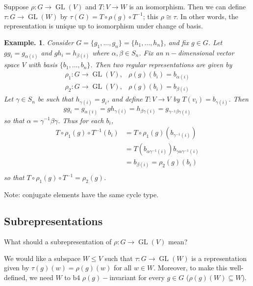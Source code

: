 \documentclass[11pt, a4paper]{memoir}
\theoremstyle{change}
\theoremstyle{plain}
\theoremstyle{nonumberplain}
\newtheorem{example}{Example.}
\DeclareMathOperator{\GL}{GL}
\numberwithin{equation}{section}
\begin{document}
Suppose $\rho:G\to\GL(V)$ and $T:V\to W$ is an isomorphism.
Then we can define $\tau:G\to\GL(W)$ by $\tau(G)=T\circ\rho(g)\circ T^{-1}$; this $\rho\cong\tau$.
In other words, the representation is unique up to isomorphism under change of basis.
\begin{example}
    Consider $G=\{g_1,\ldots,g_n\}=\{h_1,\ldots,h_n\}$, and fix $g\in G$.
    Let $gg_i=g_{\alpha(i)}$ and $gh_i=h_{\beta(i)}$ where $\alpha,\beta\in S_n$.
    Fix an $n-$dimensional vector space $V$ with basis $\{b_1,\ldots,b_n\}$.
    Then two regular representations are given by
    \begin{align*}
        \rho_1:G\to\GL(V), & \rho(g)(b_i)=b_{\alpha(i)}\\
        \rho_2:G\to\GL(V), & \rho(g)(b_i)=b_{\beta(i)}
    \end{align*}
    Let $\gamma\in S_n$ be such that $h_{\gamma(i)}=g_i$, and define $T:V\to V$ by $T(v_i)=b_{\gamma(i)}$.
    Then
    \begin{equation*}
        gg_i = g_{\alpha(i)}=gh_{\gamma(i)} = h_{\beta\gamma(i)} = g_{\gamma^{-1}\beta\gamma(i)}
    \end{equation*}
    so that $\alpha=\gamma^{-1}\beta\gamma$.
    Thus for each $b_i$,
    \begin{align*}
        T\circ\rho_1(g)\circ T^{-1}(b_i) &= T\circ\rho_1(g)(b_{\gamma^{-1}(i)})\\
                                         &= T(b_{\alpha\gamma^{-1}(i)}) b_{\gamma\alpha\gamma^{-1}(i)}\\
                                         &= b_{\beta(i)}=\rho_2(g)(b_i)\\
    \end{align*}
    so that $T\circ\rho_1(g)\circ T^{-1}=\rho_2(g)$.
\end{example}
Note: conjugate elements have the same cycle type.
\subsection{Subrepresentations}
What should a subrepresentation of $\rho:G\to\GL(V)$ mean?

We would like a subspace $W\leq V$ such that $\tau:G\to\GL(W)$ is a representation given by $\tau(g)(w)=\rho(g)(w)$ for all $w\in W$.
Moreover, to make this well-defined, we need $W$ to b4 $\rho(g)-$invariant for every $g\in G$ ($\rho(g)(W)\subseteq W$).
\end{document}
